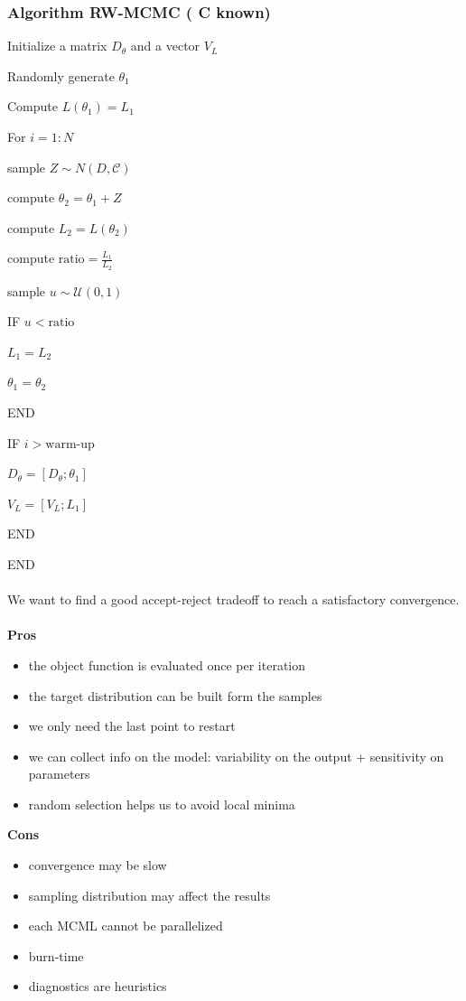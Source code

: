 \subsubsection{Algorithm RW-MCMC ( C known)}

Initialize a matrix $D_\theta$ and a vector $V_L$

Randomly generate $\theta_1$

Compute $L(\theta_1)=L_1$

For $i=1:N$

	sample $Z \sim N(D,\mathcal{C})$

	compute $\theta_2=\theta_1+Z$

	compute $L_2=L(\theta_2)$

	compute $\text{ratio}=\frac{L_1}{L_2}$

	sample $u \sim\mathcal{U}(0,1)$

	IF $u < \text{ratio}$

		$L_1=L_2$

		$\theta_1=\theta_2$

	END

	IF $i > \text{warm-up}$

		$D_\theta=[D_\theta;\theta_1]$

		$V_L=[V_L;L_1]$

	END

END
\\
\\
\noindent
We want to find a good accept-reject tradeoff to reach a satisfactory
convergence.
\\
\\
\noindent
\textbf{Pros}

\begin{itemize}
\tightlist
\item
  the object function is evaluated once per iteration
\item
  the target distribution can be built form the samples
\item
  we only need the last point to restart
\item
  we can collect info on the model: variability on the output +
  sensitivity on parameters
\item
  random selection helps us to avoid local minima
\end{itemize}

\noindent
\textbf{Cons}

\begin{itemize}
\tightlist
\item
  convergence may be slow
\item
  sampling distribution may affect the results
\item
  each MCML cannot be parallelized
\item
  burn-time
\item
  diagnostics are heuristics
\end{itemize}


